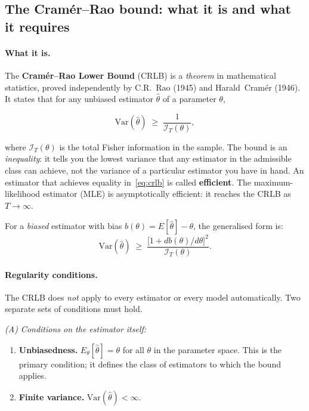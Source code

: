 \documentclass[11pt, a4paper]{article}
\begin{document}
\subsection*{The Cram\'er--Rao bound: what it is and what it requires}
\label{sec:cramer_rao}

\paragraph{What it is.}
The \textbf{Cram\'er--Rao Lower Bound} (CRLB) is a \emph{theorem} in mathematical
statistics, proved independently by C.R.~Rao (1945) and Harald~Cram\'er (1946).
It states that for any unbiased estimator $\hat\theta$ of a parameter $\theta$,

\begin{equation}
    \mathrm{Var}(\hat\theta) \;\geq\; \frac{1}{\mathcal{I}_T(\theta)},
    \label{eq:crlb}
\end{equation}

where $\mathcal{I}_T(\theta)$ is the total Fisher information in the sample.
The bound is an \emph{inequality}: it tells you the lowest variance that any
estimator in the admissible class can achieve, not the variance of a particular
estimator you have in hand.
An estimator that achieves equality in~\eqref{eq:crlb} is called \textbf{efficient}.
The maximum-likelihood estimator (MLE) is asymptotically efficient: it reaches
the CRLB as $T\to\infty$.

For a \emph{biased} estimator with bias $b(\theta) = E[\hat\theta] - \theta$,
the generalised form is:
\begin{equation}
    \mathrm{Var}(\hat\theta) \;\geq\;
    \frac{\bigl[1 + db(\theta)/d\theta\bigr]^2}{\mathcal{I}_T(\theta)}.
\end{equation}

\paragraph{Regularity conditions.}
The CRLB does \emph{not} apply to every estimator or every model automatically.
Two separate sets of conditions must hold.

\medskip
\noindent\textit{(A) Conditions on the estimator itself:}

\begin{enumerate}[noitemsep]
    \item \textbf{Unbiasedness.} $E_\theta[\hat\theta] = \theta$ for all $\theta$
    in the parameter space.
    This is the primary condition; it defines the class of estimators to which the
    bound applies.
    \item \textbf{Finite variance.} $\mathrm{Var}(\hat\theta) < \infty$.
\end{enumerate}
\end{document}
